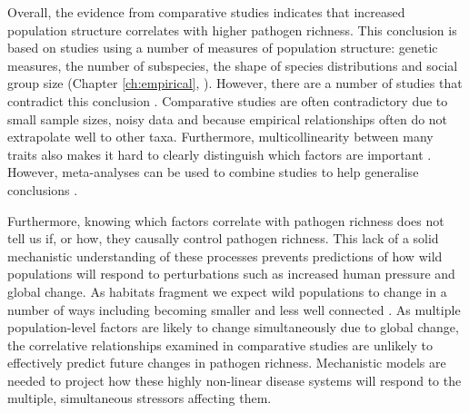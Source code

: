 Overall, the evidence from comparative studies indicates that increased population structure correlates with higher pathogen richness.
This conclusion is based on studies using a number of measures of population structure: genetic measures, the number of subspecies, the shape of species distributions and social group size (Chapter \ref{ch:empirical}, \cites{vitone2004body, maganga2014bat, turmelle2009correlates}).
However, there are a number of studies that contradict this conclusion \cite{gay2014parasite, bordes2007rodent, ezenwa2006host}.
Comparative studies are often contradictory due to small sample sizes, noisy data and because empirical relationships often do not extrapolate well to other taxa. 
Furthermore, multicollinearity between many traits also makes it hard to clearly distinguish which factors are important \cite{nunn2015infectious}.
However, meta-analyses can be used to combine studies to help generalise conclusions \cite{kamiya2014determines}.



Furthermore, knowing which factors correlate with pathogen richness does not tell us if, or how, they causally control pathogen richness.
This lack of a solid mechanistic understanding of these processes prevents predictions of how wild populations will respond to perturbations such as increased human pressure and global change.
As habitats fragment we expect wild populations to change in a number of ways including becoming smaller and less well connected \cite{andren1994effects, cushman2012separating}.
As multiple population-level factors are likely to change simultaneously due to global change, the correlative relationships examined in comparative studies are unlikely to effectively predict future changes in pathogen richness.
Mechanistic models are needed to project how these highly non-linear disease systems will respond to the multiple, simultaneous stressors affecting them.





